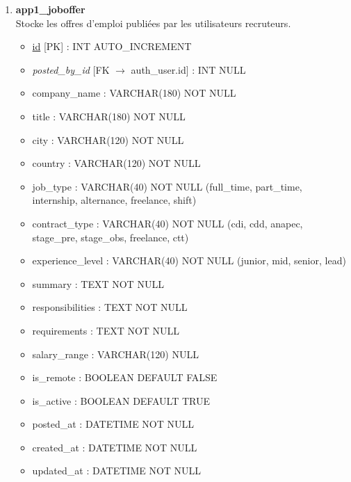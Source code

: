 \begin{enumerate}
    \item \textbf{app1\_joboffer} \\
    Stocke les offres d'emploi publiées par les utilisateurs recruteurs.
    \begin{itemize}
        \item \underline{id} [PK] : INT AUTO\_INCREMENT
        \item \textit{posted\_by\_id} [FK $\rightarrow$ auth\_user.id] : INT NULL
        \item company\_name : VARCHAR(180) NOT NULL
        \item title : VARCHAR(180) NOT NULL
        \item city : VARCHAR(120) NOT NULL
        \item country : VARCHAR(120) NOT NULL
        \item job\_type : VARCHAR(40) NOT NULL (full\_time, part\_time, internship, alternance, freelance, shift)
        \item contract\_type : VARCHAR(40) NOT NULL (cdi, cdd, anapec, stage\_pre, stage\_obs, freelance, ctt)
        \item experience\_level : VARCHAR(40) NOT NULL (junior, mid, senior, lead)
        \item summary : TEXT NOT NULL
        \item responsibilities : TEXT NOT NULL
        \item requirements : TEXT NOT NULL
        \item salary\_range : VARCHAR(120) NULL
        \item is\_remote : BOOLEAN DEFAULT FALSE
        \item is\_active : BOOLEAN DEFAULT TRUE
        \item posted\_at : DATETIME NOT NULL
        \item created\_at : DATETIME NOT NULL
        \item updated\_at : DATETIME NOT NULL
    \end{itemize}


\end{enumerate}
